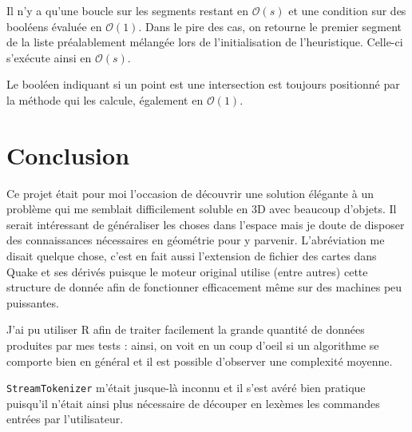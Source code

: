 \documentclass[12pt,twocolumn]{article}
\newcommand{\bigO}{\mathcal{O}}
\begin{document}
Il n'y a qu'une boucle sur les segments restant en $\bigO(s)$ et
une condition sur des booléens évaluée en $\bigO(1)$.
Dans le pire des cas, on retourne le premier segment de la liste
préalablement mélangée lors de l'initialisation de l'heuristique.
Celle-ci s'exécute ainsi en $\bigO(s)$.

Le booléen indiquant si un point est une intersection est toujours
positionné par la méthode qui les calcule, également en $\bigO(1)$.


\section{Conclusion}
Ce projet était pour moi l'occasion de découvrir une solution élégante à un
problème qui me semblait difficilement soluble en 3D avec beaucoup d'objets.
Il serait intéressant de généraliser les choses dans l'espace mais je doute
de disposer des connaissances nécessaires en géométrie pour y parvenir.
L'abréviation me disait quelque chose, c'est en fait aussi l'extension de
fichier des cartes dans Quake et ses dérivés puisque le moteur original utilise
(entre autres) cette structure de donnée afin de fonctionner efficacement
même sur des machines peu puissantes.

J'ai pu utiliser R afin de traiter facilement la grande quantité de données
produites par mes tests : ainsi, on voit en un coup d'oeil si un algorithme se
comporte bien en général et il est possible d'observer une complexité moyenne.

\texttt{StreamTokenizer} m'était jusque-là inconnu et il s'est avéré bien
pratique puisqu'il n'était ainsi plus nécessaire de découper en lexèmes
les commandes entrées par l'utilisateur.



\end{document}
